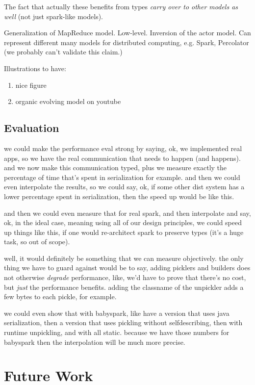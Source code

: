 \documentclass[preprint]{sigplanconf}
\theoremstyle{definition}
\theoremstyle{definition}
\begin{document}
The fact that actually these benefits from types \emph{carry over to other
models as well} (not just spark-like models).


Generalization of MapReduce model. Low-level. Inversion of the actor model.
Can represent different many models for distributed computing, e.g. Spark,
Percolator (we probably can't validate this claim.)

Illustrations to have:
\begin{enumerate}
\item nice figure
\item organic evolving model on youtube
\end{enumerate}

\subsection{Evaluation}

we could make the performance eval strong by saying, ok, we implemented real
apps, so we have the real communication that needs to happen (and happens).
and we now make this communication typed, plus we measure exactly the
percentage of time that's spent in serialization for example. and then we
could even interpolate the results, so we could say, ok, if some other dist
system has a lower percentage spent in serialization, then the speed up would
be like this.

and then we could even measure that for real spark, and then interpolate and
say, ok, in the ideal case, meaning using all of our design principles, we
could speed up things like this, if one would re-architect spark to preserve
types (it's a huge task, so out of scope).

well, it would definitely be something that we can measure objectively. the
only thing we have to guard against would be to say, adding picklers and
builders does not otherwise \emph{degrade} performance, like, we'd have to
prove that there's no cost, but \emph{just} the performance benefits. adding
the classname of the unpickler adds a few bytes to each pickle, for example.

we could even show that with babyspark, like have a version that uses java
serialization, then a version that uses pickling without selfdescribing, then
with runtime unpickling, and with all static. because we have those numbers
for babyspark then the interpolation will be much more precise.



\section{Future Work}
\end{document}
